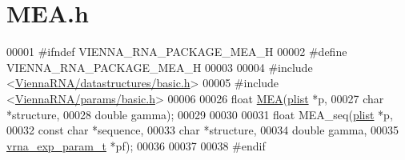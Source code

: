 \hypertarget{MEA_8h_source}{}\section{M\+E\+A.\+h}
\label{MEA_8h_source}

\begin{DoxyCode}
00001 \textcolor{preprocessor}{#ifndef VIENNA\_RNA\_PACKAGE\_MEA\_H}
00002 \textcolor{preprocessor}{#define VIENNA\_RNA\_PACKAGE\_MEA\_H}
00003 
00004 \textcolor{preprocessor}{#include <\hyperlink{datastructures_2basic_8h}{ViennaRNA/datastructures/basic.h}>}
00005 \textcolor{preprocessor}{#include <\hyperlink{params_2basic_8h}{ViennaRNA/params/basic.h}>}
00006 
00026 \textcolor{keywordtype}{float} \hyperlink{group__mea__fold_ga396ec6144c6a74fcbab4cea6b42d76c3}{MEA}(\hyperlink{group__struct__utils__plist_structvrna__elem__prob__s}{plist}   *p,
00027           \textcolor{keywordtype}{char}    *structure,
00028           \textcolor{keywordtype}{double}  gamma);
00029 
00030 
00031 \textcolor{keywordtype}{float} MEA\_seq(\hyperlink{group__struct__utils__plist_structvrna__elem__prob__s}{plist}             *p,
00032               \textcolor{keyword}{const} \textcolor{keywordtype}{char}        *sequence,
00033               \textcolor{keywordtype}{char}              *structure,
00034               \textcolor{keywordtype}{double}            gamma,
00035               \hyperlink{group__energy__parameters_structvrna__exp__param__s}{vrna\_exp\_param\_t}  *pf);
00036 
00037 
00038 \textcolor{preprocessor}{#endif}
\end{DoxyCode}
